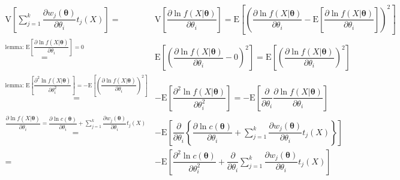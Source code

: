 \documentclass[
]{book}
\theoremstyle{definition}
\theoremstyle{definition}
\theoremstyle{definition}
\theoremstyle{definition}
\theoremstyle{remark}
\begin{document}
\[
\begin{aligned}
\mathrm{V}\left[\sum\limits _{j=1}^{k}\dfrac{\partial w_{{\scriptscriptstyle j}}\left(\boldsymbol{\theta}\right)}{\partial\theta_{{\scriptscriptstyle i}}}t_{{\scriptscriptstyle j}}\left(X\right)\right]= & \mathrm{V}\left[\dfrac{\partial\ln f\left(X|\boldsymbol{\theta}\right)}{\partial\theta_{{\scriptscriptstyle i}}}\right]=\mathrm{E}\left[\left(\dfrac{\partial\ln f\left(X|\boldsymbol{\theta}\right)}{\partial\theta_{{\scriptscriptstyle i}}}-\mathrm{E}\left[\dfrac{\partial\ln f\left(X|\boldsymbol{\theta}\right)}{\partial\theta_{{\scriptscriptstyle i}}}\right]\right)^{2}\right]\\
\overset{\text{lemma: }\mathrm{E}\left[\dfrac{\partial\ln f\left(X|\boldsymbol{\theta}\right)}{\partial\theta_{{\scriptscriptstyle i}}}\right]=0}{=} & \mathrm{E}\left[\left(\dfrac{\partial\ln f\left(X|\boldsymbol{\theta}\right)}{\partial\theta_{{\scriptscriptstyle i}}}-0\right)^{2}\right]=\mathrm{E}\left[\left(\dfrac{\partial\ln f\left(X|\boldsymbol{\theta}\right)}{\partial\theta_{{\scriptscriptstyle i}}}\right)^{2}\right]\\
\overset{\text{lemma: }\mathrm{E}\left[\dfrac{\partial^{2}\ln f\left(X|\boldsymbol{\theta}\right)}{\partial\theta_{{\scriptscriptstyle i}}^{2}}\right]=-\mathrm{E}\left[\left(\dfrac{\partial\ln f\left(X|\boldsymbol{\theta}\right)}{\partial\theta_{{\scriptscriptstyle i}}}\right)^{2}\right]}{=} & -\mathrm{E}\left[\dfrac{\partial^{2}\ln f\left(X|\boldsymbol{\theta}\right)}{\partial\theta_{{\scriptscriptstyle i}}^{2}}\right]=-\mathrm{E}\left[\dfrac{\partial}{\partial\theta_{{\scriptscriptstyle i}}}\dfrac{\partial\ln f\left(X|\boldsymbol{\theta}\right)}{\partial\theta_{{\scriptscriptstyle i}}}\right]\\
\overset{\dfrac{\partial\ln f\left(X|\boldsymbol{\theta}\right)}{\partial\theta_{{\scriptscriptstyle i}}}=\dfrac{\partial\ln c\left(\boldsymbol{\theta}\right)}{\partial\theta_{{\scriptscriptstyle i}}}+\sum\limits _{j=1}^{k}\dfrac{\partial w_{{\scriptscriptstyle j}}\left(\boldsymbol{\theta}\right)}{\partial\theta_{{\scriptscriptstyle i}}}t_{{\scriptscriptstyle j}}\left(X\right)}{=} & -\mathrm{E}\left[\dfrac{\partial}{\partial\theta_{{\scriptscriptstyle i}}}\left\{ \dfrac{\partial\ln c\left(\boldsymbol{\theta}\right)}{\partial\theta_{{\scriptscriptstyle i}}}+\sum\limits _{j=1}^{k}\dfrac{\partial w_{{\scriptscriptstyle j}}\left(\boldsymbol{\theta}\right)}{\partial\theta_{{\scriptscriptstyle i}}}t_{{\scriptscriptstyle j}}\left(X\right)\right\} \right]\\
= & -\mathrm{E}\left[\dfrac{\partial^{2}\ln c\left(\boldsymbol{\theta}\right)}{\partial\theta_{{\scriptscriptstyle i}}^{2}}+\dfrac{\partial}{\partial\theta_{{\scriptscriptstyle i}}}\sum\limits _{j=1}^{k}\dfrac{\partial w_{{\scriptscriptstyle j}}\left(\boldsymbol{\theta}\right)}{\partial\theta_{{\scriptscriptstyle i}}}t_{{\scriptscriptstyle j}}\left(X\right)\right]\\

\end{aligned}\]
\end{document}
